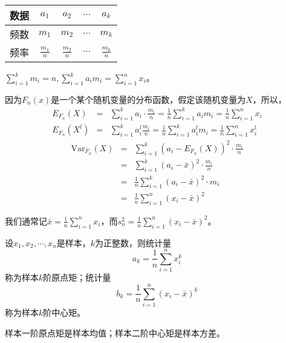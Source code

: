 \begin{table}[ht]
\centering 
\begin{tabular}{c cccc}
\hline
数据 & $a_1$ & $a_2$ & $\cdots$ & $a_k$ \\ 
\hline
频数 & $m_1$ & $m_2$ & $\cdots$ & $m_k$ \\
\hline
频率 & $\frac{m_1}{n}$ & $\frac{m_2}{n}$ & $\cdots$ & $\frac{m_k}{n}$ \\
\hline
\end{tabular}
\end{table}



\begin{remark}
    $\sum_{i=1}^{k} m_{i}=n ,\sum_{i=1}^{k} a_{i} m_{i}=\sum_{i=1}^{n} x_{i}$。
\end{remark}

因为$F_n(x)$是一个某个随机变量的分布函数，假定该随机变量为$X$，所以，
\begin{eqnarray*}
E_{F_{n}}(X) &=&\sum_{i=1}^{k} a_{i} \cdot \frac{m_{i}}{n}=\frac{1}{n} \sum_{i=1}^{k} a_{i} m_{i}=\frac{1}{n} \sum_{i=1}^{n} x_{i} \\
E_{F_{n}}\left(X^{l}\right) &=&\sum_{i=1}^{k} a_{i}^{l} \frac{m_{i}}{n}=\frac{1}{n} \sum_{i=1}^{k} a_{i}^{l} m_{i}=\frac{1}{n} \sum_{i=1}^{n} x_{i}^{l} 
\end{eqnarray*}
\begin{eqnarray*}
\text{Var}_{F_{n}}(X) &=&\sum_{i=1}^{k}\left(a_{i}-E_{F_{n}}(X)\right)^{2} \cdot \frac{m_{i}}{n} \\
&=&\sum_{i=1}^{k}\left(a_{i}-\bar{x}\right)^{2} \cdot \frac{m_{i}}{n} \\
&=&\frac{1}{n} \sum_{i=1}^{k}\left(a_{i}-\bar{x}\right)^{2} \cdot m_{i} \\
&=&\frac{1}{n} \sum_{i=1}^{n}\left(x_{i}-\bar{x}\right)^{2} 
\end{eqnarray*}
\begin{remark}
    我们通常记$\bar{x} = \frac{1}{n}\sum_{i=1}^{n} x_{i} $，而$s_{n}^2 = \frac{1}{n} \sum_{i=1}^{n}\left(x_{i}-\bar{x}\right)^{2} $。
\end{remark}

\begin{definition}
    设$x_1,x_2,\cdots,x_n$是样本，$k$为正整数，则统计量
    $$
    a_k = \frac{1}{n} \sum_{i=1}^n x_i^k
    $$
    称为样本$k$阶原点矩；统计量
    $$
    b_k = \frac{1}{n} \sum_{i=1}^n (x_i-\bar{x})^k
    $$
    称为样本$k$阶中心矩。
\end{definition}
\begin{remark}
    样本一阶原点矩是样本均值；样本二阶中心矩是样本方差。
\end{remark}

